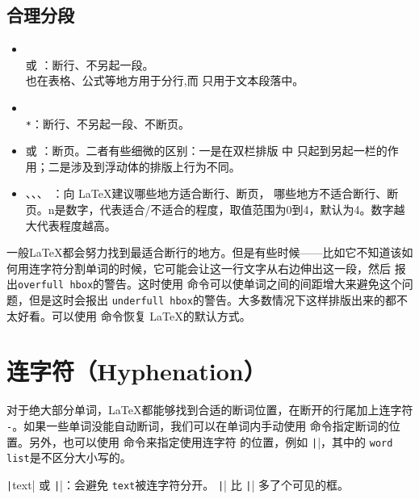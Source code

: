 \documentclass[UTF8]{ctexart}
\begin{document}
\subsection{合理分段}
\begin{itemize}
    \item \texttt{\\} 或 \texttt{\newline}：断行、不另起一段。
    \texttt{\\} 也在表格、公式等地方用于分行,而 \texttt{\newline} 只用于文本段落中。
    \item \texttt{\\*}：断行、不另起一段、不断页。
    \item \texttt{\newpage} 或 \texttt{\clearpage}：断页。二者有些细微的区别：一是在双栏排版
    中 \texttt{\newpage} 只起到另起一栏的作用；二是涉及到浮动体的排版上行为不同。
    \item \texttt{\linebreak[n]}、\texttt{\nolinebreak[n]}、\texttt{\pagebreak[n]}、
    \texttt{\nopagebreak[n]}：向 \LaTeX 建议哪些地方适合断行、断页，
    哪些地方不适合断行、断页。n是数字，代表适合/不适合的程度，取值范围为0到4，默认为4。数字越大代表程度越高。
\end{itemize}

一般\LaTeX 都会努力找到最适合断行的地方。但是有些时候——比如它不知道该如何用连字符分割单词的时候，它可能会让这一行文字从右边伸出这一段，然后
报出\texttt{overfull hbox}的警告。这时使用 \texttt{\sloppy} 命令可以使单词之间的间距增大来避免这个问题，但是这时会报出
\texttt{underfull hbox}的警告。大多数情况下这样排版出来的都不太好看。可以使用 \texttt{\fussy} 命令恢复 \LaTeX 的默认方式。

\section{连字符（Hyphenation）}
对于绝大部分单词，\LaTeX 都能够找到合适的断词位置，在断开的行尾加上连字符 \texttt{-}。如果一些单词没能自动断词，我们可以在单词内手动使用
\texttt{\-} 命令指定断词的位置。另外，也可以使用 \texttt{} 命令来指定使用连字符
的位置，例如 \texttt||，其中的 \texttt{word list}是不区分大小写的。

\texttt|\mbox{text}| 或 \texttt||：会避免 \texttt{text}被连字符分开。
\texttt|\fbox| 比 \texttt|\mbox| 多了个可见的框。
\end{document}
